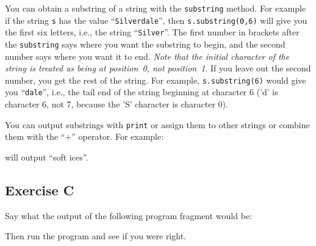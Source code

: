 You can obtain a substring of a string with the \verb!substring! method.
For example if the string \verb!s! has the value ``\verb!Silverdale!'', then
\verb!s.substring(0,6)! will give you the first six letters, i.e., the string
``\verb!Silver!''.  The first number in brackets after the \verb!substring!
says where you want the substring to begin, and the second number says
where you want it to end. \emph{Note that the initial character of the string
is treated as being at position~0, not position~1}.  If you leave out the second number,
you get the rest of the string.  For example, \verb!s.substring(6)! would
give you ``\verb!dale!'', i.e., the tail end of the string beginning at
character 6 ('d' is character 6, not 7, because the 'S' character is
character 0). 

You can output substrings with \verb!print! or assign them to other
strings or combine them with the ``+'' operator.  For example:


will output ``soft ices''.

\subsection*{Exercise C}

Say what the output of the following program fragment would be:


Then run the program and see if you were right. 



